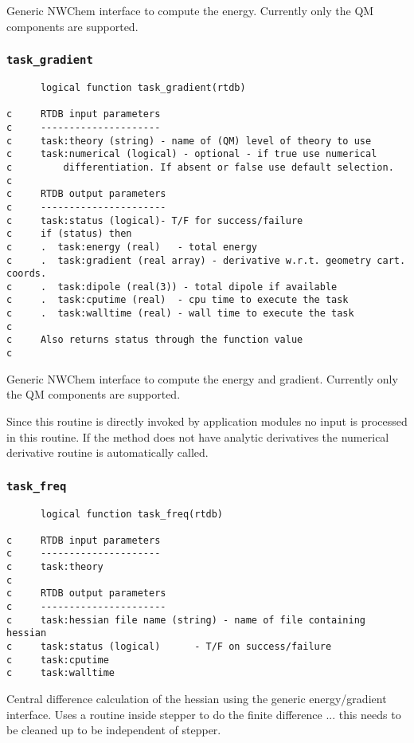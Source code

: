Generic NWChem interface to compute the energy.  Currently
only the QM components are supported.

\subsubsection{{\tt task\_gradient}}

\begin{verbatim}
      logical function task_gradient(rtdb)

c     RTDB input parameters
c     ---------------------
c     task:theory (string) - name of (QM) level of theory to use
c     task:numerical (logical) - optional - if true use numerical 
c         differentiation. If absent or false use default selection.
c     
c     RTDB output parameters
c     ----------------------
c     task:status (logical)- T/F for success/failure
c     if (status) then
c     .  task:energy (real)   - total energy
c     .  task:gradient (real array) - derivative w.r.t. geometry cart. coords.
c     .  task:dipole (real(3)) - total dipole if available
c     .  task:cputime (real)  - cpu time to execute the task
c     .  task:walltime (real) - wall time to execute the task
c
c     Also returns status through the function value
c
\end{verbatim}

Generic NWChem interface to compute the energy and gradient.  
Currently only the QM components are supported.

Since this routine is directly invoked by application modules
no input is processed in this routine.
If the method does not have analytic derivatives
the numerical derivative routine is automatically called.


\subsubsection{{\tt task\_freq}}

\begin{verbatim}
      logical function task_freq(rtdb)
     
c     RTDB input parameters
c     ---------------------
c     task:theory
c
c     RTDB output parameters
c     ----------------------
c     task:hessian file name (string) - name of file containing hessian
c     task:status (logical)      - T/F on success/failure
c     task:cputime
c     task:walltime
\end{verbatim}

Central difference calculation of the hessian using
the generic energy/gradient interface.  Uses a routine inside
stepper to do the finite difference ... this needs to be
cleaned up to be independent of stepper.

